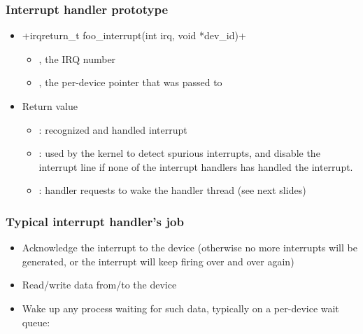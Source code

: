 \begin{frame}[fragile]
  \frametitle{Interrupt handler prototype}
  \begin{itemize}
  \item {}+irqreturn_t foo_interrupt(int irq, void *dev_id)+
    \begin{itemize}
    \item {}, the IRQ number
    \item {}, the per-device pointer that was
      passed to 
    \end{itemize}
  \item Return value
    \begin{itemize}
    \item {}: recognized and handled interrupt
    \item {}: used by the kernel to detect spurious
        interrupts, and disable the interrupt line if none of the
        interrupt handlers has handled the interrupt.
    \item {}: handler requests to wake the
        handler thread (see next slides)
    \end{itemize}
  \end{itemize}
\end{frame}

\begin{frame}
  \frametitle{Typical interrupt handler's job}
  \begin{itemize}
  \item Acknowledge the interrupt to the device (otherwise no more
    interrupts will be generated, or the interrupt will keep firing
    over and over again)
  \item Read/write data from/to the device
  \item Wake up any process waiting for such data, typically on a
    per-device wait queue:\\
\end{itemize}
\end{frame}

